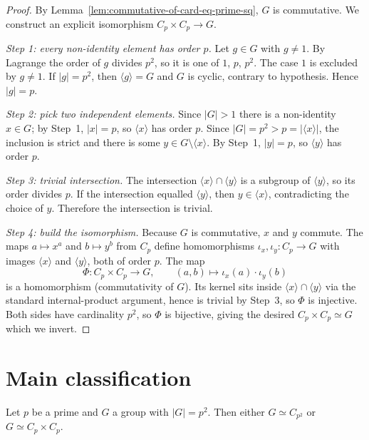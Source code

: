 \begin{proof}
  By Lemma~\ref{lem:commutative-of-card-eq-prime-sq}, $G$ is commutative.
  We construct an explicit isomorphism $C_p \times C_p \to G$.

  \smallskip
  \noindent\emph{Step 1: every non-identity element has order $p$.} Let
  $g \in G$ with $g \neq 1$. By Lagrange the order of $g$ divides $p^2$, so
  it is one of $1$, $p$, $p^2$. The case $1$ is excluded by $g \neq 1$. If
  $|g| = p^2$, then $\langle g \rangle = G$ and $G$ is cyclic, contrary to
  hypothesis. Hence $|g| = p$.

  \smallskip
  \noindent\emph{Step 2: pick two independent elements.} Since $|G| > 1$
  there is a non-identity $x \in G$; by Step~1, $|x| = p$, so $\langle x
  \rangle$ has order $p$. Since $|G| = p^2 > p = |\langle x \rangle|$, the
  inclusion is strict and there is some $y \in G \setminus \langle x
  \rangle$. By Step~1, $|y| = p$, so $\langle y \rangle$ has order $p$.

  \smallskip
  \noindent\emph{Step 3: trivial intersection.} The intersection $\langle x
  \rangle \cap \langle y \rangle$ is a subgroup of $\langle y \rangle$, so
  its order divides $p$. If the intersection equalled $\langle y \rangle$,
  then $y \in \langle x \rangle$, contradicting the choice of $y$. Therefore
  the intersection is trivial.

  \smallskip
  \noindent\emph{Step 4: build the isomorphism.} Because $G$ is commutative,
  $x$ and $y$ commute. The maps $a \mapsto x^a$ and $b \mapsto y^b$ from
  $C_p$ define homomorphisms $\iota_x, \iota_y : C_p \to G$ with images
  $\langle x \rangle$ and $\langle y \rangle$, both of order $p$. The map
  \[
    \Phi : C_p \times C_p \to G, \qquad (a, b) \mapsto \iota_x(a) \cdot
    \iota_y(b)
  \]
  is a homomorphism (commutativity of $G$). Its kernel sits inside
  $\langle x \rangle \cap \langle y \rangle$ via the standard internal-product
  argument, hence is trivial by Step~3, so $\Phi$ is injective. Both sides
  have cardinality $p^2$, so $\Phi$ is bijective, giving the desired
  $C_p \times C_p \simeq G$ which we invert.
\end{proof}

\section{Main classification}

\begin{theorem}
  \label{thm:p-squared-classification}
  \leanok
  Let $p$ be a prime and $G$ a group with $|G| = p^2$. Then either
  $G \simeq C_{p^2}$ or $G \simeq C_p \times C_p$.
\end{theorem}

